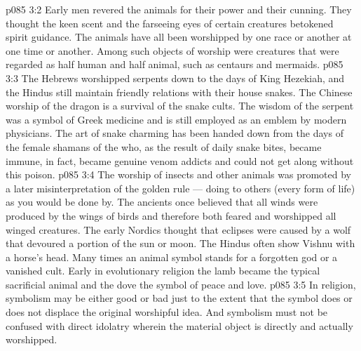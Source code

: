 \vs p085 3:2 Early men revered the animals for their power and their cunning. They thought the keen scent and the farseeing eyes of certain creatures betokened spirit guidance. The animals have all been worshipped by one race or another at one time or another. Among such objects of worship were creatures that were regarded as half human and half animal, such as centaurs and mermaids.
\vs p085 3:3 The Hebrews worshipped serpents down to the days of King Hezekiah, and the Hindus still maintain friendly relations with their house snakes. The Chinese worship of the dragon is a survival of the snake cults. The wisdom of the serpent was a symbol of Greek medicine and is still employed as an emblem by modern physicians. The art of snake charming has been handed down from the days of the female shamans of the  who, as the result of daily snake bites, became immune, in fact, became genuine venom addicts and could not get along without this poison.
\vs p085 3:4 The worship of insects and other animals was promoted by a later misinterpretation of the golden rule --- doing to others (every form of life) as you would be done by. The ancients once believed that all winds were produced by the wings of birds and therefore both feared and worshipped all winged creatures. The early Nordics thought that eclipses were caused by a wolf that devoured a portion of the sun or moon. The Hindus often show Vishnu with a horse’s head. Many times an animal symbol stands for a forgotten god or a vanished cult. Early in evolutionary religion the lamb became the typical sacrificial animal and the dove the symbol of peace and love.
\vs p085 3:5 In religion, symbolism may be either good or bad just to the extent that the symbol does or does not displace the original worshipful idea. And symbolism must not be confused with direct idolatry wherein the material object is directly and actually worshipped.
